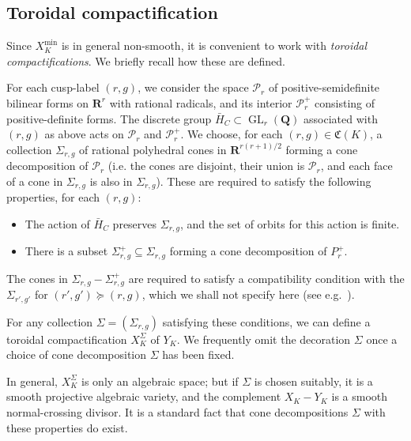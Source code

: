 \documentclass[cjm]{ipart}
\theoremstyle{plain}
\theoremstyle{remark}
\DeclareMathOperator{\GL}{GL}
\newcommand{\QQ}{\mathbf{Q}}
\newcommand{\RR}{\mathbf{R}}
\newcommand{\cP}{\mathcal{P}}
\numberwithin{equation}{subsection}
\begin{document}
 \subsection{Toroidal compactification}

  Since $X_K^{\min}$ is in general non-smooth, it is convenient to work with \emph{toroidal compactifications}. We briefly recall how these are defined.

  For each cusp-label $(r, g)$, we consider the space $\cP_r$ of positive-semidefinite bilinear forms on $\RR^r$ with rational radicals, and its interior $\cP_r^+$ consisting of positive-definite forms. The discrete group $\bar{H}_C \subset \GL_r(\QQ)$ associated with $(r, g)$ as above acts on $\cP_r$ and $\cP_r^+$. We choose, for each $(r, g) \in \mathfrak{C}(K)$, a collection $\Sigma_{r, g}$ of rational polyhedral cones in $\RR^{r(r+1)/2}$ forming a cone decomposition of $\cP_r$ (i.e. the cones are disjoint, their union is $\cP_r$, and each face of a cone in $\Sigma_{r, g}$ is also in $\Sigma_{r, g}$). These are required to satisfy the following properties, for each $(r, g)$:
  \begin{itemize}
   \item The action of $\bar{H}_C$ preserves $\Sigma_{r, g}$, and the set of orbits for this action is finite.
   \item There is a subset $\Sigma^+_{r, g} \subseteq \Sigma_{r, g}$ forming a cone decomposition of $P_r^+$.
  \end{itemize}
  The cones in $\Sigma_{r, g} - \Sigma_{r, g}^+$ are required to satisfy a compatibility condition with the $\Sigma_{r', g'}$ for $(r', g') \succcurlyeq (r, g)$, which we shall not specify here (see e.g.~\cite{faltingschai}).

  For any collection $\Sigma = (\Sigma_{r, g})$ satisfying these conditions, we can define a toroidal compactification $X_K^\Sigma$ of $Y_K$. We frequently omit the decoration $\Sigma$ once a choice of cone decomposition $\Sigma$ has been fixed.

  In general, $X_K^{\Sigma}$ is only an algebraic space; but if $\Sigma$ is chosen suitably, it is a smooth projective algebraic variety, and the complement $X_K - Y_K$ is a smooth normal-crossing divisor. It is a standard fact that cone decompositions $\Sigma$ with these properties do exist.
\end{document}
